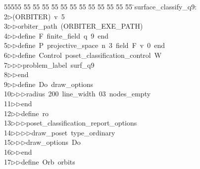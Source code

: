 %
%
\begin{tabbing}
55555 \= 55 \= 55 \= 55 \= 55 \= 55 \= 55 \= 55 \= 55 \= 55 \= 55 \= 55 \= 55 \= \>surface\_classify\_q9:\\[0pt]
2\>$\triangleright$\>(ORBITER)\ v\ 5\ \\[0pt]
3\>$\triangleright$\>$\triangleright$\>orbiter\_path\ (ORBITER\_EXE\_PATH)\ \\[0pt]
4\>$\triangleright$\>$\triangleright$\>define\ F\ finite\_field\ q\ 9\ end\ \\[0pt]
5\>$\triangleright$\>$\triangleright$\>define\ P\ projective\_space\ n\ 3\ field\ F\ v\ 0\ end\ \\[0pt]
6\>$\triangleright$\>$\triangleright$\>define\ Control\ poset\_classification\_control\ W\ \\[0pt]
7\>$\triangleright$\>$\triangleright$\>$\triangleright$\>problem\_label\ surf\_q9\ \\[0pt]
8\>$\triangleright$\>$\triangleright$\>end\ \\[0pt]
9\>$\triangleright$\>$\triangleright$\>define\ Do\ draw\_options\ \\[0pt]
10\>$\triangleright$\>$\triangleright$\>$\triangleright$\>radius\ 200\ line\_width\ 03\ nodes\_empty\ \\[0pt]
11\>$\triangleright$\>$\triangleright$\>end\ \\[0pt]
12\>$\triangleright$\>$\triangleright$\>define\ ro\ \\[0pt]
13\>$\triangleright$\>$\triangleright$\>$\triangleright$\>poset\_classification\_report\_options\ \\[0pt]
14\>$\triangleright$\>$\triangleright$\>$\triangleright$\>$\triangleright$\>draw\_poset\ type\_ordinary\ \\[0pt]
15\>$\triangleright$\>$\triangleright$\>$\triangleright$\>draw\_options\ Do\ \\[0pt]
16\>$\triangleright$\>$\triangleright$\>end\ \\[0pt]
17\>$\triangleright$\>$\triangleright$\>define\ Orb\ orbits\ \\[0pt]

\end{tabbing}
